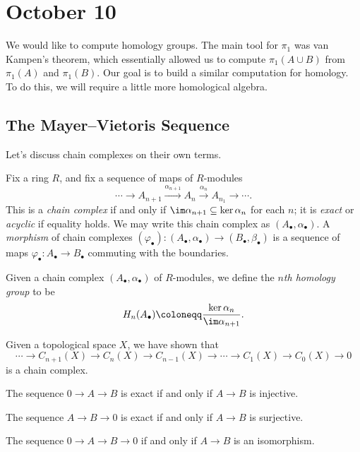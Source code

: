 \documentclass[../notes.tex]{subfiles}
\begin{document}
\section{October 10}

We would like to compute homology groups. The main tool for $\pi_1$ was van Kampen's theorem, which essentially allowed us to compute $\pi_1(A\cup B)$ from $\pi_1(A)$ and $\pi_1(B)$. Our goal is to build a similar computation for homology. To do this, we will require a little more homological algebra.

\subsection{The Mayer--Vietoris Sequence}
Let's discuss chain complexes on their own terms.
\begin{definition}
	Fix a ring $R$, and fix a sequence of maps of $R$-modules
	\[\cdots\to A_{n+1}\xrightarrow{\alpha_{n+1}}A_n\xrightarrow{\alpha_n}A_{n_1}\to\cdots.\]
	This is a \textit{chain complex} if and only if $\im\alpha_{n+1}\subseteq\ker\alpha_n$ for each $n$; it is \textit{exact} or \textit{acyclic} if equality holds. We may write this chain complex as $(A_\bullet,\alpha_\bullet)$. A \textit{morphism} of chain complexes $(\varphi_\bullet)\colon(A_\bullet,\alpha_\bullet)\to(B_\bullet,\beta_\bullet)$ is a sequence of maps $\varphi_\bullet\colon A_\bullet\to B_\bullet$ commuting with the boundaries.
\end{definition}
\begin{definition}
	Given a chain complex $(A_\bullet,\alpha_\bullet)$ of $R$-modules, we define the \textit{$n$th homology group} to be
	\[H_n(A_\bullet)\coloneqq\frac{\ker\alpha_n}{\im\alpha_{n+1}}.\]
\end{definition}
\begin{example}
	Given a topological space $X$, we have shown that
	\[\cdots\to C_{n+1}(X)\to C_n(X)\to C_{n-1}(X)\to\cdots\to C_1(X)\to C_0(X)\to0\]
	is a chain complex.
\end{example}
\begin{example}
	The sequence $0\to A\to B$ is exact if and only if $A\to B$ is injective.
\end{example}
\begin{example}
	The sequence $A\to B\to0$ is exact if and only if $A\to B$ is surjective.
\end{example}
\begin{example}
	The sequence $0\to A\to B\to 0$ if and only if $A\to B$ is an isomorphism.
\end{example}
\end{document}
